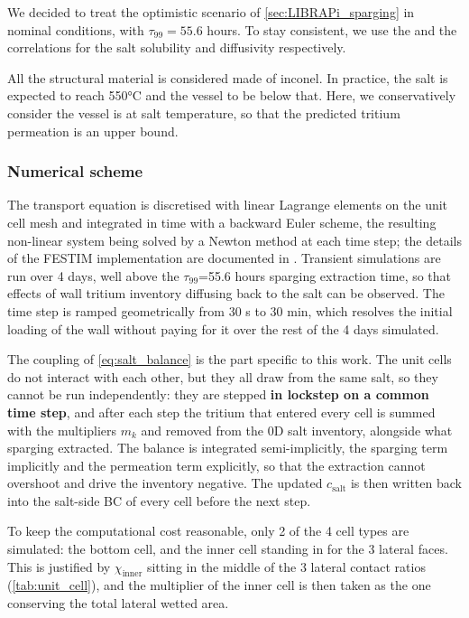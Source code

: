 \documentclass[a4paper,11pt,oneside]{report}
\begin{document}
We decided to treat the optimistic scenario of \cref{sec:LIBRAPi_sparging} in nominal conditions, with $\tau_{99}=55.6$ hours. To stay consistent, we use the \textcite{malinauskas_solubilities_1974} and the \textcite{fukada_hydrogen_2006} correlations for the salt solubility and diffusivity respectively.

All the structural material is considered made of inconel. In practice, the salt is expected to reach 550°C and the vessel to be below that. Here, we conservatively consider the vessel is at salt temperature, so that the predicted tritium permeation is an upper bound.

\subsubsection{Numerical scheme}

The transport equation is discretised with linear Lagrange elements on the unit cell mesh and integrated in time with a backward Euler scheme, the resulting non-linear system being solved by a Newton method at each time step; the details of the FESTIM implementation are documented in \textcite{delaporte-mathurin_festim_2024}. Transient simulations are run over 4 days, well above the $\tau_{99}$=55.6 hours sparging extraction time, so that effects of wall tritium inventory diffusing back to the salt can be observed. The time step is ramped geometrically from 30 s to 30 min, which resolves the initial loading of the wall without paying for it over the rest of the 4 days simulated.

The coupling of \cref{eq:salt_balance} is the part specific to this work. The unit cells do not interact with each other, but they all draw from the same salt, so they cannot be run independently: they are stepped \textbf{in lockstep on a common time step}, and after each step the tritium that entered every cell is summed with the multipliers $m_k$ and removed from the 0D salt inventory, alongside what sparging extracted. The balance is integrated semi-implicitly, the sparging term implicitly and the permeation term explicitly, so that the extraction cannot overshoot and drive the inventory negative. The updated $c_\mathrm{salt}$ is then written back into the salt-side BC of every cell before the next step. 

To keep the computational cost reasonable, only 2 of the 4 cell types are simulated: the bottom cell, and the inner cell standing in for the 3 lateral faces. This is justified by $\chi_\mathrm{inner}$ sitting in the middle of the 3 lateral contact ratios (\cref{tab:unit_cell}), and the multiplier of the inner cell is then taken as the one conserving the total lateral wetted area.
\end{document}
